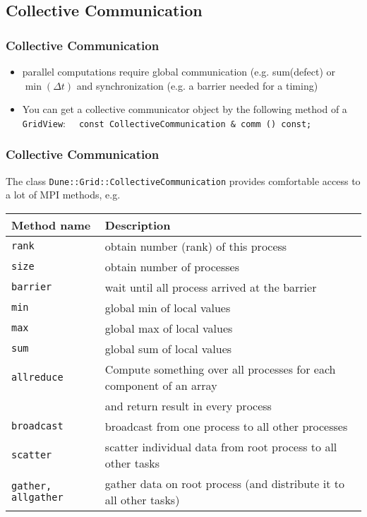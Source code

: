 \subsection{Collective Communication}

\begin{frame}[fragile]
  \frametitle<presentation>{Collective Communication}
  \begin{itemize}
  \item parallel computations require global communication (e.g. sum(defect) or $\min(\Delta t)$
        and synchronization (e.g. a barrier needed for a timing)
  \item You can get a collective communicator object by the following method of a \lstinline!GridView!:
    \lstinline!  const CollectiveCommunication & comm () const;!
  \end{itemize}
\vfill
\vfill
\vfill
\vfill
\vfill
\vfill

\end{frame}

\begin{frame}[fragile]
  \frametitle<presentation>{Collective Communication}
The class  \lstinline!Dune::Grid::CollectiveCommunication! provides comfortable access to a lot of MPI methods, e.g.\medskip

    \begin{tabular}{l|p{7cm}}
      \hline
      Method name & Description\\\hline
      \lstinline!rank! & obtain number (rank) of this process\\
      \lstinline!size! & obtain number of processes \\
      \lstinline!barrier! & wait until all process arrived at the barrier\\
      \lstinline!min! & global min of local values\\
      \lstinline!max! & global max of local values\\
      \lstinline!sum! & global sum of local values\\
      \lstinline!allreduce! & Compute something over all processes for each component of an array \\
      &and return result in every process\\
      \lstinline!broadcast! & broadcast from one process to all other processes\\
      \lstinline!scatter! & scatter individual data from root process to all other tasks\\
      \lstinline!gather, allgather! & gather data on root process (and distribute it to all other tasks)\\
      \hline
    \end{tabular}

\end{frame}

